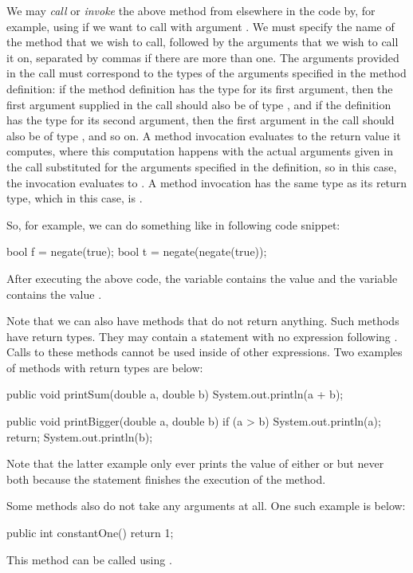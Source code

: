 We may \emph{call} or \emph{invoke} the above  method from elsewhere in the code by,
for example, using  if we want to call  with argument
.
We must specify the name of the method that we wish to call, followed by the arguments
that we wish to call it on, separated by commas if there are more than one.
The arguments provided in the call must correspond to the types of the arguments
specified in the method definition: if the method definition has the type 
for its first argument, then the first argument supplied in the call should also be
of type , and if the definition has the type  for its second argument,
then the first argument in the call should also be of type , and so on.
A method invocation evaluates to the return value it computes, where this
computation happens with the actual arguments
given in the call substituted for the arguments specified in the definition, so in
this case, the invocation  evaluates to .
A method invocation has the same type as its return type, which in this case, is .

So, for example, we can do something like in following code snippet:
\begin{code}
  bool f = negate(true);
  bool t = negate(negate(true));
\end{code}
After executing the above code, the variable  contains the value 
and the variable  contains the value .

Note that we can also have methods that do not return anything. Such
methods have  return types. They may contain a 
statement with no expression following .
Calls to these methods cannot be used inside of other expressions.
Two examples of methods with  return types are below:
\begin{code}
public void printSum(double a, double b) {
  System.out.println(a + b);
}
\end{code}

\begin{code}
public void printBigger(double a, double b) {
  if (a > b) {
    System.out.println(a);
    return;
  }
  System.out.println(b);
}
\end{code}
Note that the latter example only ever prints the value of either  or  but
never both because
the  statement finishes the execution of the method.

Some methods also do not take any arguments at all. One such example is below:
\begin{code}
public int constantOne() {
  return 1;
}
\end{code}
\noindent This method can be called using .

